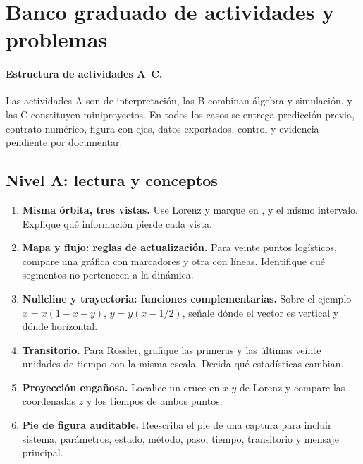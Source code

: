 \section[\texorpdfstring{\hspace{0.45em}}{}Banco graduado de actividades y problemas]{Banco graduado de actividades y problemas}

\paragraph{Estructura de actividades A--C.}
Las actividades A son de interpretación, las B combinan álgebra y simulación, y las C
constituyen miniproyectos. En todos los casos se entrega predicción previa, contrato
numérico, figura con ejes, datos exportados, control y evidencia pendiente por documentar.

\subsection*{Nivel A: lectura y conceptos}
\begin{enumerate}
  \item[A1.] \textbf{Misma órbita, tres vistas.} Use Lorenz y marque en
  ,  y  el mismo intervalo.
  Explique qué información pierde cada vista.
  \item[A2.] \textbf{Mapa y flujo: reglas de actualización.} Para veinte puntos logísticos, compare una
  gráfica con marcadores y otra con líneas. Identifique qué segmentos no pertenecen a
  la dinámica.
  \item[A3.] \textbf{Nullcline y trayectoria: funciones complementarias.} Sobre el ejemplo
  \(\dot x=x(1-x-y)\), \(\dot y=y(x-1/2)\), señale dónde el vector es vertical y
  dónde horizontal.
  \item[A4.] \textbf{Transitorio.} Para Rössler, grafique las primeras y las últimas
  veinte unidades de tiempo con la misma escala. Decida qué estadísticas cambian.
  \item[A5.] \textbf{Proyección engañosa.} Localice un cruce en \(x\)-\(y\) de
  Lorenz y compare las coordenadas \(z\) y los tiempos de ambos puntos.
  \item[A6.] \textbf{Pie de figura auditable.} Reescriba el pie de una captura para
  incluir sistema, parámetros, estado, método, paso, tiempo, transitorio y mensaje
  principal.
\end{enumerate}

